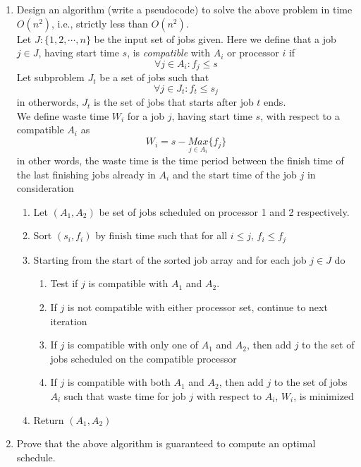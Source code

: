 \documentclass[11pt]{article}
\begin{document}
\begin{enumerate}
  \item Design an algorithm (write a pseudocode) to solve the above problem in time $O(n^2)$, i.e., strictly less than $O(n^2)$.\\

  Let $J: \{ 1, 2, \cdots, n\}$ be the input set of jobs given. Here we define that a job $j\in J$, having start time $s$, is \textit{compatible} with $A_i$ or processor $i$ if
  \[
    \forall j \in A_i: f_j \leq s
  \]
  Let subproblem $J_t$ be a set of jobs such that
  \[
    \forall j \in J_t: f_t \leq s_j
  \]
  in otherwords, $J_t$ is the set of jobs that starts after job $t$ ends. \\
  We define waste time $W_i$ for a job $j$, having start time $s$, with respect to a compatible $A_i$ as
  \[
    W_i = s - \underset{j\in A_i}{Max}\{ f_j \}
  \]
  in other words, the waste time is the time period between the finish time of the last finishing jobs already in $A_i$ and the start time of the job $j$ in consideration

  \begin{enumerate}
    \item Let $(A_1, A_2)$ be set of jobs scheduled on processor 1 and 2 respectively.
    \item Sort $(s_i, f_i)$ by finish time such that for all $i\leq j$, $f_i \leq f_j$
    \item Starting from the start of the sorted job array and for each job $j \in J$ do
    \begin{enumerate}
      \item Test if $j$ is compatible with $A_1$ and $A_2$.
      \item If $j$ is not compatible with either processor set, continue to next iteration
      \item If $j$ is compatible with only one of $A_1$ and $A_2$, then add $j$ to the set of jobs scheduled on the compatible processor
      \item If $j$ is compatible with both $A_1$ and $A_2$, then add $j$ to the set of jobs $A_i$ such that waste time for job $j$ with respect to $A_i$, $W_i$, is minimized
    \end{enumerate}
    \item Return $(A_1, A_2)$
  \end{enumerate}


  \item Prove that the above algorithm is guaranteed to compute an optimal schedule.


\end{enumerate}
\end{document}

